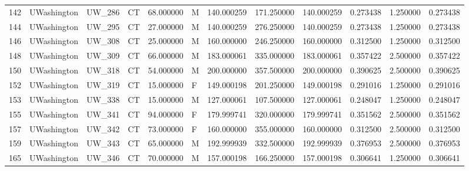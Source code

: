 \begin{tabular}{llllrlrrrrrr}
142    &     UWashington &       UW\_286 &                 CT &  68.000000 &        M &       140.000259 &    171.250000 &  140.000259 &               0.273438 &            1.250000 &          0.273438 \\
144    &     UWashington &       UW\_295 &                 CT &  27.000000 &        M &       140.000259 &    276.250000 &  140.000259 &               0.273438 &            1.250000 &          0.273438 \\
146    &     UWashington &       UW\_308 &                 CT &  25.000000 &        M &       160.000000 &    246.250000 &  160.000000 &               0.312500 &            1.250000 &          0.312500 \\
148    &     UWashington &       UW\_309 &                 CT &  66.000000 &        M &       183.000061 &    335.000000 &  183.000061 &               0.357422 &            2.500000 &          0.357422 \\
150    &     UWashington &       UW\_318 &                 CT &  54.000000 &        M &       200.000000 &    357.500000 &  200.000000 &               0.390625 &            2.500000 &          0.390625 \\
152    &     UWashington &       UW\_319 &                 CT &  15.000000 &        F &       149.000198 &    201.250000 &  149.000198 &               0.291016 &            1.250000 &          0.291016 \\
153    &     UWashington &       UW\_338 &                 CT &  15.000000 &        M &       127.000061 &    107.500000 &  127.000061 &               0.248047 &            1.250000 &          0.248047 \\
155    &     UWashington &       UW\_341 &                 CT &  94.000000 &        F &       179.999741 &    320.000000 &  179.999741 &               0.351562 &            2.500000 &          0.351562 \\
157    &     UWashington &       UW\_342 &                 CT &  73.000000 &        F &       160.000000 &    355.000000 &  160.000000 &               0.312500 &            2.500000 &          0.312500 \\
159    &     UWashington &       UW\_343 &                 CT &  65.000000 &        M &       192.999939 &    332.500000 &  192.999939 &               0.376953 &            2.500000 &          0.376953 \\
165    &     UWashington &       UW\_346 &                 CT &  70.000000 &        M &       157.000198 &    166.250000 &  157.000198 &               0.306641 &            1.250000 &          0.306641 \\

\end{tabular}
